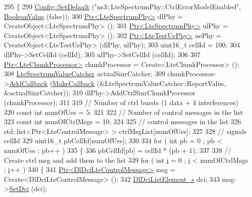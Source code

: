 \begin{DoxyCode}
295 \{
299   \hyperlink{group__config_ga2e7882df849d8ba4aaad31c934c40c06}{Config::SetDefault} (\textcolor{stringliteral}{"ns3::LteSpectrumPhy::CtrlErrorModelEnabled"}, 
      \hyperlink{classns3_1_1BooleanValue}{BooleanValue} (\textcolor{keyword}{false}));
300   \hyperlink{classns3_1_1Ptr}{Ptr<LteSpectrumPhy>} dlPhy = CreateObject<LteSpectrumPhy> ();
301   \hyperlink{classns3_1_1Ptr}{Ptr<LteSpectrumPhy>} ulPhy = CreateObject<LteSpectrumPhy> ();
302   \hyperlink{classns3_1_1Ptr}{Ptr<LteTestUePhy>} uePhy = CreateObject<LteTestUePhy> (dlPhy, ulPhy);
303   uint16\_t cellId = 100;
304   dlPhy->SetCellId (cellId);
305   ulPhy->SetCellId (cellId);
306   
307   \hyperlink{classns3_1_1Ptr}{Ptr<LteChunkProcessor>} chunkProcessor = Create<LteChunkProcessor> ();
308   \hyperlink{classns3_1_1LteSpectrumValueCatcher}{LteSpectrumValueCatcher} actualSinrCatcher;
309   chunkProcessor->\hyperlink{classns3_1_1LteChunkProcessor_a122d4a00d72e68a0a8b2cbdd165cdfd8}{AddCallback} (\hyperlink{group__makecallbackmemptr_ga9376283685aa99d204048d6a4b7610a4}{MakeCallback} (&LteSpectrumValueCatcher::ReportValue, 
      &actualSinrCatcher));
310   dlPhy->AddCtrlSinrChunkProcessor (chunkProcessor);
311 
319   \textcolor{comment}{// Number of ctrl bursts (1 data + 4 interferences)}
320   \textcolor{keyword}{const} \textcolor{keywordtype}{int} numOfUes = 5;
321   
322   \textcolor{comment}{// Number of control messages in the list}
323   \textcolor{keyword}{const} \textcolor{keywordtype}{int} numOfCtrlMsgs = 10;
324   
325   \textcolor{comment}{// control messages in the list}
326   std::list<Ptr<LteControlMessage> > ctrlMsgList[numOfUes];
327   
328   \textcolor{comment}{// signals cellId}
329   uint16\_t pbCellId[numOfUes];
330   
334   \textcolor{keywordflow}{for} ( \textcolor{keywordtype}{int} pb = 0 ; pb < numOfUes ; pb++ )
335   \{
336     pbCellId[pb] = cellId * (pb + 1);
337     
338     \textcolor{comment}{// Create ctrl msg and add them to the list}
339     \textcolor{keywordflow}{for} ( \textcolor{keywordtype}{int} \hyperlink{bernuolliDistribution_8m_a6f6ccfcf58b31cb6412107d9d5281426}{i} = 0 ; \hyperlink{bernuolliDistribution_8m_a6f6ccfcf58b31cb6412107d9d5281426}{i} < numOfCtrlMsgs ; \hyperlink{bernuolliDistribution_8m_a6f6ccfcf58b31cb6412107d9d5281426}{i}++ )
340       \{
341         \hyperlink{classns3_1_1Ptr}{Ptr<DlDciLteControlMessage>} msg = Create<DlDciLteControlMessage> ();
342         \hyperlink{structns3_1_1DlDciListElement__s}{DlDciListElement\_s} dci;
343         msg->\hyperlink{classns3_1_1DlDciLteControlMessage_a4920a5f0de6f6d6c220166467d84428e}{SetDci} (dci);

\end{DoxyCode}
